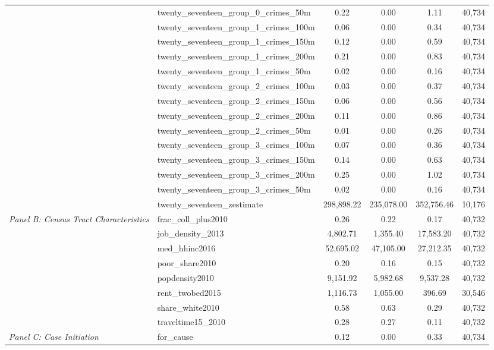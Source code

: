 \begin{tabular}{llcccc}
 & twenty_seventeen_group_0_crimes_50m & 0.22 & 0.00 & 1.11 & 40,734 \\
 & twenty_seventeen_group_1_crimes_100m & 0.06 & 0.00 & 0.34 & 40,734 \\
 & twenty_seventeen_group_1_crimes_150m & 0.12 & 0.00 & 0.59 & 40,734 \\
 & twenty_seventeen_group_1_crimes_200m & 0.21 & 0.00 & 0.83 & 40,734 \\
 & twenty_seventeen_group_1_crimes_50m & 0.02 & 0.00 & 0.16 & 40,734 \\
 & twenty_seventeen_group_2_crimes_100m & 0.03 & 0.00 & 0.37 & 40,734 \\
 & twenty_seventeen_group_2_crimes_150m & 0.06 & 0.00 & 0.56 & 40,734 \\
 & twenty_seventeen_group_2_crimes_200m & 0.11 & 0.00 & 0.86 & 40,734 \\
 & twenty_seventeen_group_2_crimes_50m & 0.01 & 0.00 & 0.26 & 40,734 \\
 & twenty_seventeen_group_3_crimes_100m & 0.07 & 0.00 & 0.36 & 40,734 \\
 & twenty_seventeen_group_3_crimes_150m & 0.14 & 0.00 & 0.63 & 40,734 \\
 & twenty_seventeen_group_3_crimes_200m & 0.25 & 0.00 & 1.02 & 40,734 \\
 & twenty_seventeen_group_3_crimes_50m & 0.02 & 0.00 & 0.16 & 40,734 \\
 & twenty_seventeen_zestimate & 298,898.22 & 235,078.00 & 352,756.46 & 10,176 \\
\cline{1-6}
\multirow[c]{8}{4cm}{\textit{Panel B: Census Tract Characteristics}} & frac_coll_plus2010 & 0.26 & 0.22 & 0.17 & 40,732 \\
 & job_density_2013 & 4,802.71 & 1,355.40 & 17,583.20 & 40,732 \\
 & med_hhinc2016 & 52,695.02 & 47,105.00 & 27,212.35 & 40,732 \\
 & poor_share2010 & 0.20 & 0.16 & 0.15 & 40,732 \\
 & popdensity2010 & 9,151.92 & 5,982.68 & 9,537.28 & 40,732 \\
 & rent_twobed2015 & 1,116.73 & 1,055.00 & 396.69 & 30,546 \\
 & share_white2010 & 0.58 & 0.63 & 0.29 & 40,732 \\
 & traveltime15_2010 & 0.28 & 0.27 & 0.11 & 40,732 \\
\cline{1-6}
\multirow[c]{3}{4cm}{\textit{Panel C: Case Initiation}} & for_cause & 0.12 & 0.00 & 0.33 & 40,734 \\

\end{tabular}
